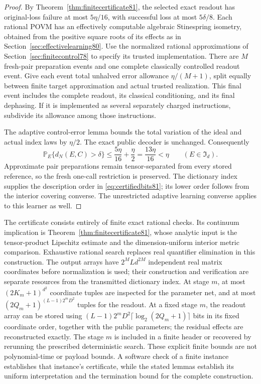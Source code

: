 \begin{proof}
By Theorem~\ref{thm:finitecertificate81}, the selected exact readout
has original-loss failure at most $5\eta/16$, with successful loss
at most $5\delta/8$.  Each rational POVM has an effectively
computable algebraic Stinespring isometry, obtained from the
positive square roots of its effects as in
Section~\ref{sec:effectivelearning80}.  Use the normalized rational
approximations of Section~\ref{sec:finitecontrol78} to specify its
trusted implementation.  There are $M$ fresh-pair preparation
events and one complete classically controlled readout event.
Give each event total unhalved error allowance $\eta/(M+1)$,
split equally between finite target approximation and actual
trusted realization.  This final event includes the complete
readout, its classical conditioning, and its final dephasing.
If it is implemented as several separately charged instructions,
subdivide its allowance among those instructions.

The adaptive control-error lemma bounds the total variation of the
ideal and actual index laws by $\eta/2$.  The exact public decoder
is unchanged.  Consequently
\[
 \mathbb P_E\{d_N(E,C)>\delta\}
 \le\frac{5\eta}{16}+\frac\eta2
 =\frac{13\eta}{16}<\eta
 \qquad(E\in\mathfrak I_d).
\]
Approximate pair preparations remain tensor-separated from every
stored reference, so the fresh one-call restriction is preserved.
The dictionary index supplies the description order in
\eqref{eq:certifiedbits81}; its lower order follows from the
interior covering converse.  The unrestricted adaptive learning
converse applies to this learner as well.
\end{proof}

The certificate consists entirely of finite exact rational checks.
Its continuum implication is Theorem~\ref{thm:finitecertificate81},
whose analytic input is the tensor-product Lipschitz estimate and
the dimension-uniform interior metric comparison.  Exhaustive
rational search replaces real quantifier elimination in this
construction.  The output arrays have $2^M Ld^{2M}$ independent real matrix
coordinates before normalization is used; their
construction and verification are separate resources from the
transmitted dictionary index.  At stage $m$, at most
$(2K_m+1)^{d^2}$ coordinate tuples are inspected for the parameter
net, and at most $(2Q_m+1)^{(L-1)2^mD^2}$ tuples for the readout.
At a fixed stage $m$, the readout array can be stored using $(L-1)2^mD^2\lceil\log_2(2Q_m+1)\rceil$
bits in its fixed coordinate order, together with the public parameters;
the residual effects are reconstructed exactly.  The stage $m$ is
included in a finite header or recovered by rerunning the prescribed
deterministic search.  These explicit finite
bounds are not polynomial-time or payload bounds.  A software check of a finite
instance establishes that instance's certificate, while the stated
lemmas establish its uniform interpretation and the termination
bound for the complete construction.
